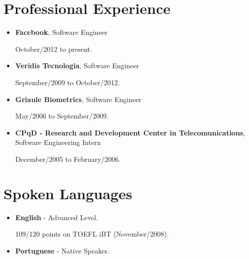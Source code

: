 \documentclass[a4paper,10pt]{article}
\begin{document}
  \section{Professional Experience}
    \begin{itemize}
      \item  
        \textbf{Facebook}, Software Engineer
        
        October/2012 to present.

        \item  
        \textbf{Veridis Tecnologia}, Software Engineer

        September/2009 to October/2012.

      \item  
        \textbf{Griaule Biometrics}, Software Engineer

        May/2006 to September/2009.

      \item
        \textbf{CPqD - Research and Development Center in Telecomunications}, Software Engineering Intern

        December/2005 to February/2006.
    \end{itemize}

  \section{Spoken Languages}
    \begin{itemize}
      \item  
        \textbf{English} - Advanced Level.

        109/120 points on TOEFL iBT (November/2008).

      \item  
        \textbf{Portuguese} - Native Speaker.
    \end{itemize}
\end{document}
